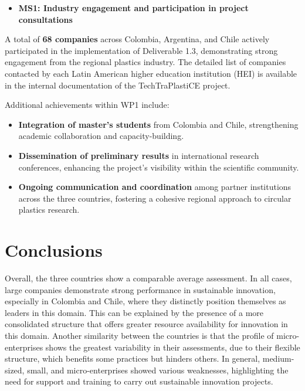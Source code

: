 \documentclass[
  12pt,
  oneside]{book}
\providecommand{\tightlist}{%
  \setlength{\itemsep}{0pt}\setlength{\parskip}{0pt}}
\begin{document}
\begin{tcolorbox}[enhanced jigsaw, arc=.35mm, bottomrule=.15mm, bottomtitle=1mm, breakable, colback=white, colbacktitle=quarto-callout-tip-color!10!white, colframe=quarto-callout-tip-color-frame, coltitle=black, left=2mm, leftrule=.75mm, opacityback=0, opacitybacktitle=0.6, rightrule=.15mm, title=\textcolor{quarto-callout-tip-color}{\faLightbulb}\hspace{0.5em}{Milestone Achieved -- TechTraPlastiCE WP1}, titlerule=0mm, toprule=.15mm, toptitle=1mm]

\begin{itemize}
\tightlist
\item
  \textbf{MS1: Industry engagement and participation in project
  consultations}
\end{itemize}

A total of \textbf{68 companies} across Colombia, Argentina, and Chile
actively participated in the implementation of Deliverable 1.3,
demonstrating strong engagement from the regional plastics industry. The
detailed list of companies contacted by each Latin American higher
education institution (HEI) is available in the internal documentation
of the TechTraPlastiCE project.

Additional achievements within WP1 include:

\begin{itemize}
\tightlist
\item
  \textbf{Integration of master's students} from Colombia and Chile,
  strengthening academic collaboration and capacity-building.
\item
  \textbf{Dissemination of preliminary results} in international
  research conferences, enhancing the project's visibility within the
  scientific community.
\item
  \textbf{Ongoing communication and coordination} among partner
  institutions across the three countries, fostering a cohesive regional
  approach to circular plastics research.
\end{itemize}

\end{tcolorbox}

\chapter{Conclusions}\label{conclusions}

Overall, the three countries show a comparable average assessment. In
all cases, large companies demonstrate strong performance in sustainable
innovation, especially in Colombia and Chile, where they distinctly
position themselves as leaders in this domain. This can be explained by
the presence of a more consolidated structure that offers greater
resource availability for innovation in this domain. Another similarity
between the countries is that the profile of micro-enterprises shows the
greatest variability in their assessments, due to their flexible
structure, which benefits some practices but hinders others. In general,
medium-sized, small, and micro-enterprises showed various weaknesses,
highlighting the need for support and training to carry out sustainable
innovation projects.
\end{document}
